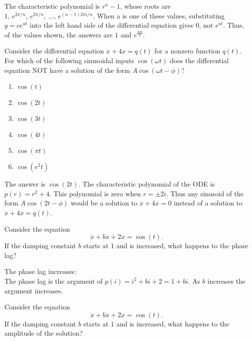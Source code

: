 The characteristic polynomial is $r^n − 1$, whose roots are
$1,\,  e^{2 \pi / n},\,e^{2 \pi / n},\, \dots , \, e^{(n-1) 2\pi i/n}$.
When a is one of these values, substituting $y=ce^{at}$ into the left hand side of
the differential equation gives $0$, not $e^{at}$.
Thus, of the values shown, the answers are $1$ and $e^{\frac{2i\pi }{n}}$.

\begin{homework}
  Consider the differential equation $\ddot x + 4x=q(t)$ for a nonzero function $q(t)$.
  For which of the following sinusoidal inputs $\cos⁡ (\omega t)$ does the differential equation
  NOT have a solution of the form $A \cos⁡(\omega t − \phi)$?
\end{homework}

\begin{enumerate}
\item $\cos (t)$
\item $\cos (2t)$
\item $\cos (3t)$
\item $\cos (4t)$
\item $\cos (\pi t)$
\item $\cos (e^2 t)$
\end{enumerate}

The answer is $\cos⁡ (2t)$.
The characteristic polynomial of the ODE is $p(r)=r^2+4$.
This polynomial is zero when $r= \pm 2i$.
Thus any sinusoid of the form $A \cos⁡ (2t− \phi)$ would be a solution to
$\ddot x + 4x=0$ instead of a solution to $\ddot x+ 4x = q(t)$.

\begin{homework}
  Consider the equation
  \begin{equation*}
    \ddot x + b\dot x + 2x = \cos (t).
  \end{equation*}
  If the damping constant $b$ starts at $1$ and is increased, what happens to the phase lag?
\end{homework}  

The phase lag increases: \\
The phase lag is the argument of $p(i)=i^2+bi+2=1+bi$. As $b$ increases the argument increases.

\begin{homework}
  Consider the equation
  \begin{equation*}
    \ddot x + b\dot x + 2x = \cos (t).
  \end{equation*}
  If the damping constant $b$ starts at $1$ and is increased,
  what happens to the amplitude of the solution?
\end{homework}

